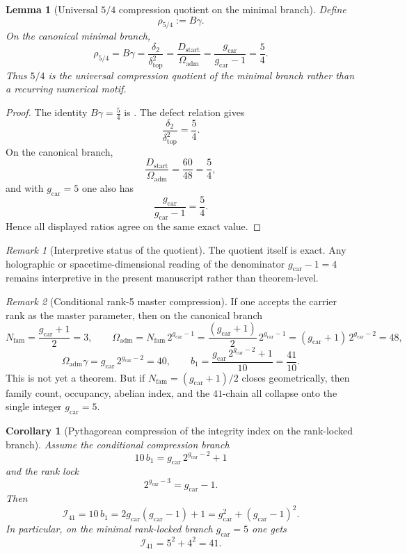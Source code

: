 \documentclass[11pt,a4paper]{article}
\newtheorem{corollary}[theorem]{Corollary}
\newtheorem{lemma}[theorem]{Lemma}
\theoremstyle{definition}
\theoremstyle{remark}
\newtheorem*{remark}{Remark}
\newcommand{\deltatop}{\delta_{\mathrm{top}}}
\newcommand{\bone}{b_1}
\newcommand{\Oadm}{\Omega_{\mathrm{adm}}}
\newcommand{\gcar}{g_{\mathrm{car}}}
\newcommand{\Dstart}{D_{\mathrm{start}}}
\begin{document}
\begin{lemma}[Universal \texorpdfstring{$5/4$}{5/4} compression quotient on the minimal branch]
\label{lem:universal-5-4-compression}
Define
\[
\rho_{5/4}:=B\gamma.
\]
On the canonical minimal branch,
\[
\rho_{5/4}
=
B\gamma
=
\frac{\delta_2}{\deltatop^2}
=
\frac{\Dstart}{\Oadm}
=
\frac{\gcar}{\gcar-1}
=
\frac54.
\]
Thus $5/4$ is the universal compression quotient of the minimal branch rather than a recurring numerical motif.
\end{lemma}

\begin{proof}
The identity $B\gamma=\frac54$ is . The defect relation gives
\[
\frac{\delta_2}{\deltatop^2}=\frac54.
\]
On the canonical branch,
\[
\frac{\Dstart}{\Oadm}=\frac{60}{48}=\frac54,
\]
and with $\gcar=5$ one also has
\[
\frac{\gcar}{\gcar-1}=\frac{5}{4}.
\]
Hence all displayed ratios agree on the same exact value.
\end{proof}

\begin{remark}[Interpretive status of the quotient]
The quotient itself is exact. Any holographic or spacetime-dimensional reading of the denominator $\gcar-1=4$ remains interpretive in the present manuscript rather than theorem-level.
\end{remark}

\begin{remark}[Conditional rank-5 master compression]
If one accepts the carrier rank as the master parameter, then on the canonical branch
\[
N_{\mathrm{fam}}=\frac{\gcar+1}{2}=3,
\qquad
\Oadm=N_{\mathrm{fam}}\,2^{\gcar-1}=\frac{(\gcar+1)}{2}\,2^{\gcar-1}=(\gcar+1)\,2^{\gcar-2}=48,
\]
\[
\Oadm\gamma=\gcar\,2^{\gcar-2}=40,
\qquad
\bone=\frac{\gcar\,2^{\gcar-2}+1}{10}=\frac{41}{10}.
\]
This is not yet a theorem. But if $N_{\mathrm{fam}}=(\gcar+1)/2$ closes geometrically, then family count, occupancy, abelian index, and the $41$-chain all collapse onto the single integer $\gcar=5$.
\end{remark}

\begin{corollary}[Pythagorean compression of the integrity index on the rank-locked branch]
\label{cor:pythagorean-integrity-index}
Assume the conditional compression branch
\[
10\,\bone=\gcar\,2^{\gcar-2}+1
\]
and the rank lock
\[
2^{\gcar-3}=\gcar-1.
\]
Then
\[
\mathcal I_{41}
=
10\,\bone
=
2\gcar(\gcar-1)+1
=
\gcar^2+(\gcar-1)^2.
\]
In particular, on the minimal rank-locked branch $\gcar=5$ one gets
\[
\mathcal I_{41}=5^2+4^2=41.
\]
\end{corollary}
\end{document}
